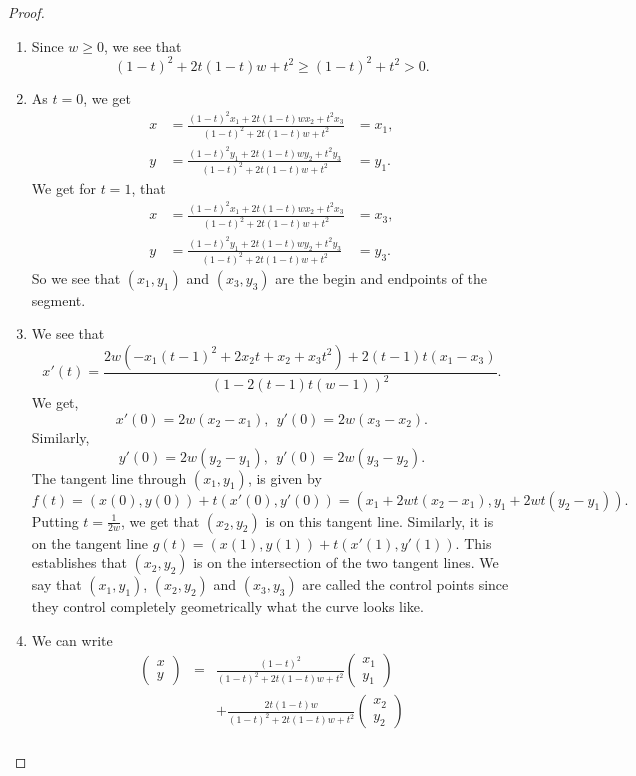 \begin{proof}
    \begin{enumerate}
        \item Since $w\geq 0$, we see that
        $$(1-t)^2 + 2t(1-t)w + t^2\geq (1-t)^2 + t^2 > 0.$$
        \item As $t=0$, we get
\begin{align*}
    x & = \frac{(1-t)^2 x_1 + 2t(1-t)wx_2 + t^2 x_3}{(1-t)^2 + 2t(1-t)w + t^2} & = x_1,\\
    y & = \frac{(1-t)^2 y_1 + 2t(1-t)wy_2 + t^2 y_3}{(1-t)^2 + 2t(1-t)w + t^2} & = y_1.   
\end{align*}        
We get for $t=1$, that
\begin{align*}
    x & = \frac{(1-t)^2 x_1 + 2t(1-t)wx_2 + t^2 x_3}{(1-t)^2 + 2t(1-t)w + t^2} & = x_3,\\
    y & = \frac{(1-t)^2 y_1 + 2t(1-t)wy_2 + t^2 y_3}{(1-t)^2 + 2t(1-t)w + t^2} & = y_3.   
\end{align*}     
So we see that $(x_1,y_1)$ and $(x_3, y_3)$ are the begin and endpoints of the segment.
\item We see that 
$$x'(t) = \frac{2w(-x_1(t-1)^2 + 2x_2t + x_2 + x_3t^2) + 2(t-1)t(x_1 - x_3)}{(1 - 2(t-1)t(w-1))^2}.$$
We get,
$$x'(0) = 2w(x_2 - x_1),~~y'(0) = 2w(x_3 - x_2).$$
Similarly,
$$y'(0) = 2w(y_2 - y_1),~~y'(0) = 2w(y_3 - y_2).$$
The tangent line through $(x_1, y_1)$, is given by
$$f(t) = (x(0),y(0)) + t(x'(0),y'(0)) = (x_1 + 2wt (x_2 - x_1), y_1 + 2wt(y_2 - y_1)).$$
Putting $t= \frac{1}{2w}$, we get that $(x_2,y_2)$ is on this tangent line. Similarly, it is on the tangent line $g(t) = (x(1),y(1)) + t(x'(1),y'(1))$. This establishes that $(x_2,y_2)$ is on the intersection of the two tangent lines. We say that $(x_1,y_1)$, $(x_2, y_2)$ and $(x_3,y_3)$ are called the control points since they control completely geometrically what the curve looks like.
\item We can write
\begin{eqnarray*}
    \left(\begin{array}{c} x\\ y \end{array}\right) 
    & = &\frac{(1-t)^2}{(1-t)^2 + 2t(1-t)w + t^2}\left(\begin{array}{c} x_1\\ y_1 \end{array}\right)\\
    & & +\frac{2t(1-t)w}{(1-t)^2 + 2t(1-t)w + t^2}\left(\begin{array}{c} x_2\\ y_2  \end{array}\right)\\

\end{eqnarray*}
\end{enumerate}
\end{proof}
